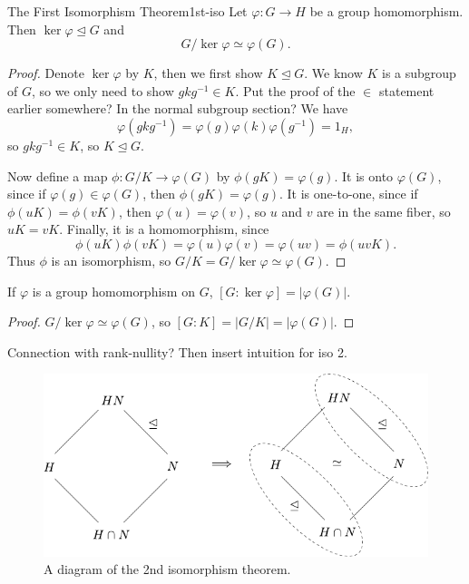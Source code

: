 \documentclass[10pt]{report}
\begin{document}
\begin{thrm}{The First Isomorphism Theorem}{1st-iso}
Let $\varphi:G\to H$ be a group homomorphism. Then $\ker \varphi \trianglelefteq G$ and
\[
	G/\ker\varphi \simeq \varphi(G).
\] 
\end{thrm}
\begin{proof}
	Denote $\ker \varphi$ by $K$, then we first show $K \trianglelefteq G$. We know $K$ is a subgroup of $G$, so we only need to show $gkg^{-1} \in K$. {\color{red}Put the proof of the $\in$ statement earlier somewhere? In the normal subgroup section?} We have
	\[
		\varphi(gkg^{-1}) = \varphi(g)\varphi(k)\varphi(g^{-1})= 1_H,
	\] so $gkg^{-1} \in K$, so $K \trianglelefteq G$.

	Now define a map $\phi:G/K\to \varphi(G)$ by $\phi(gK) = \varphi(g).$ It is onto $\varphi(G)$, since if $\varphi(g) \in \varphi(G)$, then $\phi(gK)=\varphi(g)$. It is one-to-one, since if $\phi(uK)=\phi(vK)$, then $\varphi(u)=\varphi(v)$, so $u$ and $v$ are in the same fiber, so $uK=vK$. Finally, it is a homomorphism, since
	\[
		\phi(uK)\phi(vK)=\varphi(u)\varphi(v)=\varphi(uv)=\phi(uvK).
	\] 
	Thus $\phi$ is an isomorphism, so $G/K = G/\ker \varphi \simeq \varphi(G)$.
\end{proof}

\begin{cor}
	If $\varphi$ is a group homomorphism on $G$, $[G:\ker \varphi] = |\varphi(G)|$.
\end{cor}
\begin{proof}
	$G/\ker \varphi \simeq \varphi(G)$, so $[G:K] = |G/K| = |\varphi(G)|$.
\end{proof}

{\color{red}Connection with rank-nullity? Then insert intuition for iso 2.}

\begin{figure}[H]
	\centering
	\includegraphics[scale=1]{fig/2nd-iso-thrm.pdf}
	\caption{A diagram of the 2nd isomorphism theorem.}
\end{figure}
\end{document}
